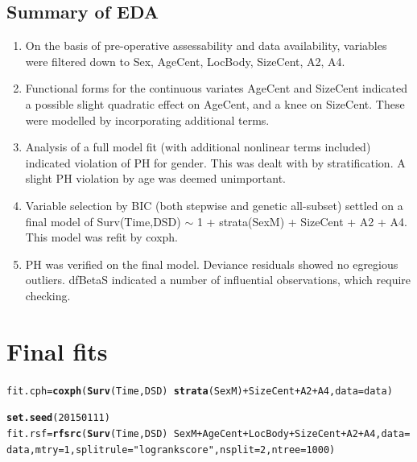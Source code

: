 \documentclass{article}\usepackage[]{graphicx}\usepackage[]{color}
\makeatletter
\newcommand{\hlnum}[1]{\textcolor[rgb]{0.686,0.059,0.569}{#1}}%
\newcommand{\hlstr}[1]{\textcolor[rgb]{0.192,0.494,0.8}{#1}}%
\newcommand{\hlopt}[1]{\textcolor[rgb]{0,0,0}{#1}}%
\newcommand{\hlstd}[1]{\textcolor[rgb]{0.345,0.345,0.345}{#1}}%
\newcommand{\hlkwb}[1]{\textcolor[rgb]{0.69,0.353,0.396}{#1}}%
\newcommand{\hlkwc}[1]{\textcolor[rgb]{0.333,0.667,0.333}{#1}}%
\newcommand{\hlkwd}[1]{\textcolor[rgb]{0.737,0.353,0.396}{\textbf{#1}}}%
\newenvironment{kframe}{%
 \def\at@end@of@kframe{}%
 \ifinner\ifhmode%
  \def\at@end@of@kframe{\end{minipage}}%
  \begin{minipage}{\columnwidth}%
 \fi\fi%
 \def\FrameCommand##1{\hskip\@totalleftmargin \hskip-\fboxsep
 \colorbox{shadecolor}{##1}\hskip-\fboxsep
     \hskip-\linewidth \hskip-\@totalleftmargin \hskip\columnwidth}%
 \MakeFramed {\advance\hsize-\width
   \@totalleftmargin\z@ \linewidth\hsize
   \@setminipage}}%
 {\par\unskip\endMakeFramed%
 \at@end@of@kframe}
\newenvironment{knitrout}{}{} %
\makeatother
\begin{document}
\subsection{Summary of EDA}
\begin{enumerate}
\item On the basis of pre-operative assessability and data availability, variables were filtered down to Sex, AgeCent, LocBody, SizeCent, A2, A4.
\item Functional forms for the continuous variates AgeCent and SizeCent indicated a possible slight quadratic effect on AgeCent, and a knee on SizeCent.  These were modelled by incorporating additional terms.
\item Analysis of a full model fit (with additional nonlinear terms included) indicated violation of PH for gender.  This was dealt with by stratification.  A slight PH violation by age was deemed unimportant. 
\item Variable selection by BIC (both stepwise and genetic all-subset) settled on a final model of Surv(Time,DSD) $\sim$ 1 + strata(SexM) + SizeCent + A2 + A4.  This model was refit by coxph. 
\item PH was verified on the final model.  Deviance residuals showed no egregious outliers. dfBetaS indicated a number of influential observations, which require checking.
\end{enumerate}

\section{Final fits}
\begin{knitrout}
\color{fgcolor}\begin{kframe}
\begin{alltt}
\hlstd{fit.cph} \hlkwb{=} \hlkwd{coxph}\hlstd{(}\hlkwd{Surv}\hlstd{(Time, DSD)} \hlopt{~} \hlkwd{strata}\hlstd{(SexM)} \hlopt{+} \hlstd{SizeCent} \hlopt{+} \hlstd{A2} \hlopt{+} \hlstd{A4,} \hlkwc{data} \hlstd{= data)}
\end{alltt}
\end{kframe}
\end{knitrout}

\begin{knitrout}
\color{fgcolor}\begin{kframe}
\begin{alltt}
\hlkwd{set.seed}\hlstd{(}\hlnum{20150111}\hlstd{)}
\hlstd{fit.rsf} \hlkwb{=} \hlkwd{rfsrc}\hlstd{(}\hlkwd{Surv}\hlstd{(Time, DSD)} \hlopt{~} \hlstd{SexM} \hlopt{+} \hlstd{AgeCent} \hlopt{+} \hlstd{LocBody} \hlopt{+} \hlstd{SizeCent} \hlopt{+} \hlstd{A2} \hlopt{+} \hlstd{A4,} \hlkwc{data} \hlstd{= data,} \hlkwc{mtry} \hlstd{=} \hlnum{1}\hlstd{,} \hlkwc{splitrule} \hlstd{=} \hlstr{"logrankscore"}\hlstd{,} \hlkwc{nsplit} \hlstd{=} \hlnum{2}\hlstd{,} \hlkwc{ntree} \hlstd{=} \hlnum{1000}\hlstd{)}
\end{alltt}
\end{kframe}
\end{knitrout}
\end{document}
